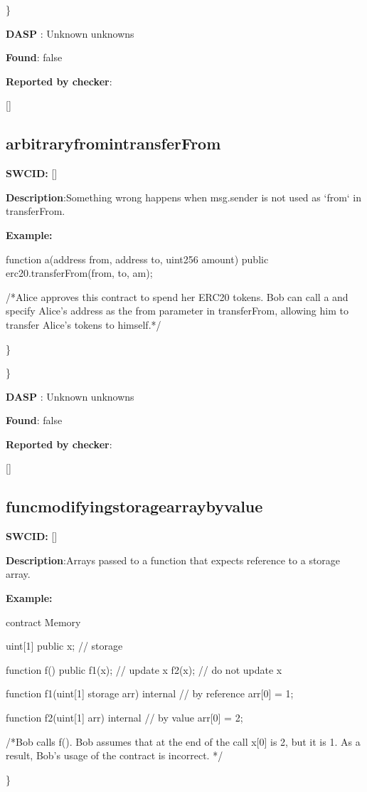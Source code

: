 \documentclass{article}
\begin{document}
\} 

\textbf{DASP} : Unknown unknowns

\textbf{Found}: false

\textbf{Reported by checker}: 
\begin{ffcode} 

[]
\end{ffcode} 
\subsection{arbitrary{\textunderscore}from{\textunderscore}in{\textunderscore}transferFrom} 
\textbf{SWC{\textunderscore}ID:} []

\textbf{Description}:Something wrong happens when msg.sender is not used as `from` in transferFrom.


\textbf{Example:} 
\begin{ffcode} 

function a(address from, address to, uint256 amount) public {
  erc20.transferFrom(from, to, am);
}

 /*Alice approves this contract to spend her ERC20 tokens. Bob can call a and specify Alice's address as the from parameter in transferFrom, allowing him to transfer Alice's tokens to himself.*/ 

\end{ffcode} 
\} 

\} 

\textbf{DASP} : Unknown unknowns

\textbf{Found}: false

\textbf{Reported by checker}: 
\begin{ffcode} 

[]
\end{ffcode} 
\subsection{func{\textunderscore}modifying{\textunderscore}storage{\textunderscore}array{\textunderscore}by{\textunderscore}value} 
\textbf{SWC{\textunderscore}ID:} []

\textbf{Description}:Arrays passed to a function that expects reference to a storage array.


\textbf{Example:} 
\begin{ffcode} 

contract Memory {
    uint[1] public x; // storage

    function f() public {
        f1(x); // update x
        f2(x); // do not update x
    }

    function f1(uint[1] storage arr) internal { // by reference
        arr[0] = 1;
    }

    function f2(uint[1] arr) internal { // by value
        arr[0] = 2;
    }
}

 /*Bob calls f(). Bob assumes that at the end of the call x[0] is 2, but it is 1. As a result, Bob's usage of the contract is incorrect. */ 

\end{ffcode} 
\} 
\end{document}
